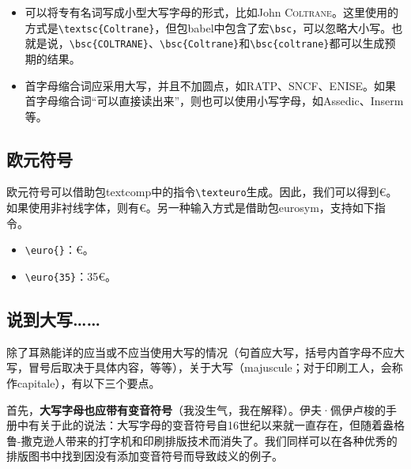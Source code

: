 \begin{itemize}
    \item 可以将专有名词写成小型大写字母的形式，比如John \textsc{Coltrane}。这里使用的方式是\linebreak\verb|\textsc{Coltrane}|，但包\textsf{babel}中包含了宏\verb|\bsc|，可以忽略大小写。也就是说，\verb|\bsc{COLTRANE}|、\linebreak\verb|\bsc{Coltrane}|和\verb|\bsc{coltrane}|都可以生成预期的结果。
    
    \item 首字母缩合词应采用大写，并且不加圆点，如RATP、SNCF、ENISE。如果首字母缩合词“可以直接读出来”，则也可以使用小写字母，如Assedic、Inserm等。
\end{itemize}

\subsection{欧元符号}

欧元符号可以借助包\textsf{textcomp}中的指令\verb|\texteuro|生成。因此，我们可以得到€。如果使用非衬线字体，则有\textsf{€}。另一种输入方式是借助包\textsf{eurosym}，支持如下指令。

\begin{itemize}
    \item \verb|\euro{}|：€。
    \item \verb|\euro{35}|：35€。
\end{itemize}

\subsection{说到大写……}

除了耳熟能详的应当或不应当使用大写的情况（句首应大写，括号内首字母不应大写，冒号后取决于具体内容，等等），关于大写（majuscule；对于印刷工人，会称作capitale），有以下三个要点。

首先，\textbf{大写字母也应带有变音符号}（我没生气，我在解释）。伊夫·佩伊卢梭的手册中有关于此的说法：大写字母的变音符号自16世纪以来就一直存在，但随着盎格鲁-撒克逊人带来的打字机和印刷排版技术而消失了。我们同样可以在各种优秀的排版图书中找到因没有添加变音符号而导致歧义的例子。

